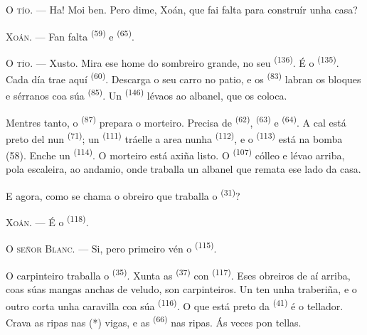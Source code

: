 \VUsaut{3.0mm}
\VUsaut{3.0mm}

\textsc{O tío}. --- Ha! Moi ben. Pero dime, Xoán, que fai falta para construír unha
casa?

\textsc{Xoán}. --- Fan falta  \textsuperscript{(59)} e
 \textsuperscript{(65)}.

\textsc{O tío}. --- Xusto. Mira ese home do sombreiro grande, no seu 
\textsuperscript{(136)}. É o  \textsuperscript{(135)}. Cada día
trae aquí  \textsuperscript{(60)}. Descarga o seu carro no
patio, e os  \textsuperscript{(83)} labran os bloques e sérranos coa
súa  \textsuperscript{(85)}. Un 
\textsuperscript{(146)} lévaos ao albanel, que os coloca.

Mentres tanto, o  \textsuperscript{(87)} prepara o morteiro.
Precisa de  \textsuperscript{(62)},  \textsuperscript{(63)} e
 \textsuperscript{(64)}. A cal está preto del nun 
\textsuperscript{(71)}; un  \textsuperscript{(111)}
tráelle a area nunha  \textsuperscript{(112)}, e o
 \textsuperscript{(113)} está na bomba (58). Enche un 
\textsuperscript{(114)}. O morteiro está axiña listo. O 
\textsuperscript{(107)} cólleo e lévao arriba, pola escaleira, ao andamio, onde
traballa un albanel que remata ese lado da casa.

E agora, como se chama o obreiro que traballa o 
\textsuperscript{(31)}?

\textsc{Xoán}. --- É o  \textsuperscript{(118)}.

\VUsaut{3.0mm}
\VUsaut{3.0mm}

\textsc{O señor Blanc}. --- Si, pero primeiro vén o 
\textsuperscript{(115)}.

O carpinteiro traballa o  \textsuperscript{(35)}. Xunta as
 \textsuperscript{(37)} con 
\textsuperscript{(117)}. Eses obreiros de aí arriba, coas súas mangas anchas de
veludo, son carpinteiros. Un ten unha traberiña, e o outro corta unha caravilla coa súa
 \textsuperscript{(116)}. O que está preto da 
\textsuperscript{(41)} é o tellador. Crava as ripas nas (*) vigas, e as
 \textsuperscript{(66)} nas ripas. Ás veces pon tellas.

